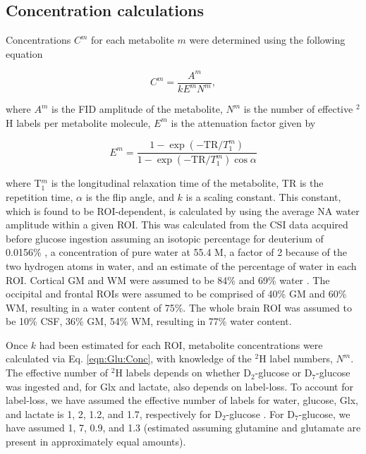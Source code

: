 \subsection{Concentration calculations}
\label{Chap:Glu:conc}

Concentrations $C^m$ for each metabolite $m$ were determined using the following equation

\begin{equation}
    C^m = \frac{A^m}{kE^mN^m},
    \label{eqn:Glu:Conc}
\end{equation}

where $A^m$ is the FID amplitude of the metabolite, $N^m$ is the number of effective $^2$H labels per metabolite molecule, $E^m$ is the attenuation factor given by

\begin{equation}
    E^m = \frac{1-\exp(-\text{TR}/T_1^m)}{1-\exp(-\text{TR}/T_1^m)\cos{\alpha}}
    \label{eqn:Glu:Atte}
\end{equation}

where T$_1^m$ is the longitudinal relaxation time of the metabolite, TR is the repetition time, $\alpha$ is the flip angle, and $k$ is a scaling constant. This constant, which is found to be \ac{ROI}-dependent, is calculated by using the average \ac{NA} water amplitude within a given \ac{ROI}. This was calculated from the \ac{CSI} data acquired before glucose ingestion assuming an isotopic percentage for deuterium of 0.0156\% \cite{Hagemann1970AbsoluteSMOW}, a concentration of pure water at 55.4 M, a factor of 2 because of the two hydrogen atoms in water, and an estimate of the percentage of water in each \ac{ROI}. Cortical \ac{GM} and \ac{WM} were assumed to be 84\% and 69\% water \cite{Oros-Peusquens2019AImplications}. The occipital and frontal \ac{ROI}s were assumed to be comprised of 40\% \ac{GM} and 60\% \ac{WM}, resulting in a water content of 75\%. The whole brain \ac{ROI} was assumed to be 10\% \ac{CSF}, 36\% \ac{GM}, 54\% \ac{WM}, resulting in 77\% water content.

Once $k$ had been estimated for each \ac{ROI}, metabolite concentrations were calculated via Eq. \ref{eqn:Glu:Conc}, with knowledge of the $^2$H label numbers, $N^m$. The effective number of $^2$H labels depends on whether D$_2$-glucose or D$_7$-glucose was ingested and, for Glx and lactate, also depends on label-loss. To account for label-loss, we have assumed the effective number of labels for water, glucose, Glx, and lactate is 1, 2, 1.2, and 1.7, respectively for D$_2$-glucose \cite{DeGraaf2021CharacterizationStudies}. For D$_7$-glucose, we have assumed 1, 7, 0.9, and 1.3 (estimated \cite{Funk2017TheGlucose} assuming glutamine and glutamate are present in approximately equal amounts). 

